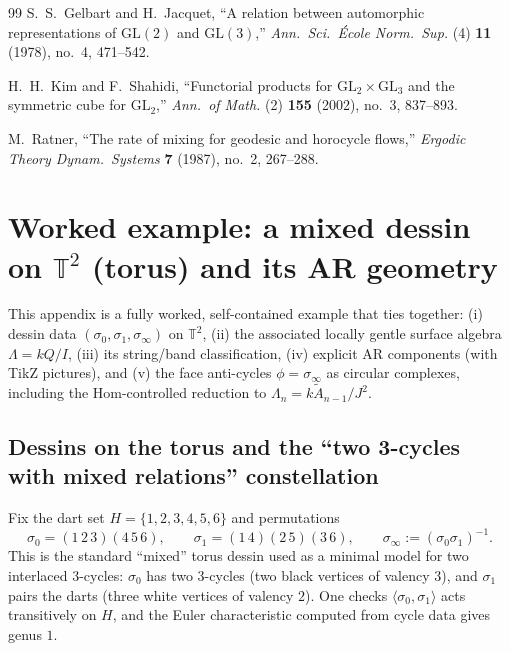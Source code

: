 \documentclass[11pt,oneside]{amsbook}
\numberwithin{equation}{section}
\theoremstyle{plain}
\theoremstyle{definition}
\theoremstyle{remark}
\begin{document}
\begin{thebibliography}{99}
S.~S.~Gelbart and H.~Jacquet,
\newblock ``A relation between automorphic representations of $\mathrm{GL}(2)$ and $\mathrm{GL}(3)$,''
\newblock \emph{Ann.\ Sci.\ \'Ecole Norm.\ Sup.} (4) \textbf{11} (1978), no.~4, 471--542.

H.~H.~Kim and F.~Shahidi,
\newblock ``Functorial products for $\mathrm{GL}_2\times\mathrm{GL}_3$ and the symmetric cube for $\mathrm{GL}_2$,''
\newblock \emph{Ann.\ of Math.} (2) \textbf{155} (2002), no.~3, 837--893.

M.~Ratner,
\newblock ``The rate of mixing for geodesic and horocycle flows,''
\newblock \emph{Ergodic Theory Dynam.\ Systems} \textbf{7} (1987), no.~2, 267--288.

\end{thebibliography}

\backmatter
\appendix

\chapter{Worked example: a mixed dessin on $\mathbb T^2$ (torus) and its AR geometry}
\label{app:torus_dessin}

This appendix is a fully worked, self-contained example that ties together:
(i) dessin data $(\sigma_0,\sigma_1,\sigma_\infty)$ on $\mathbb T^2$,
(ii) the associated locally gentle surface algebra $\Lambda=kQ/I$,
(iii) its string/band classification,
(iv) explicit AR components (with TikZ pictures),
and (v) the face anti-cycles $\phi=\sigma_\infty$ as circular complexes, including the Hom-controlled reduction to
$\Lambda_n=k\widetilde A_{n-1}/J^2$.

\section{Dessins on the torus and the ``two 3-cycles with mixed relations'' constellation}
Fix the dart set $H=\{1,2,3,4,5,6\}$ and permutations
\[
\sigma_0=(1\,2\,3)(4\,5\,6),\qquad
\sigma_1=(1\,4)(2\,5)(3\,6),
\qquad
\sigma_\infty := (\sigma_0\sigma_1)^{-1}.
\]
This is the standard ``mixed'' torus dessin used as a minimal model for two interlaced 3-cycles:
$\sigma_0$ has two 3-cycles (two black vertices of valency $3$), and $\sigma_1$ pairs the darts (three white vertices of valency $2$).
One checks $\langle\sigma_0,\sigma_1\rangle$ acts transitively on $H$, and the Euler characteristic computed from cycle data
gives genus $1$.
\end{document}
